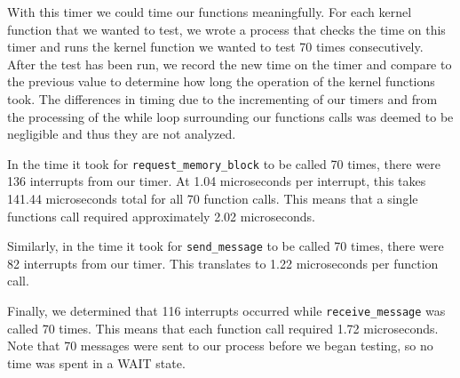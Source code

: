 \documentclass[12pt]{report}
\begin{document}
With this timer we could time our functions meaningfully.  For each kernel function that we wanted to test, we wrote a process that checks the time on this timer and runs the kernel function we wanted to test 70 times consecutively.  After the test has been run, we record the new time on the timer and compare to the previous value to determine how long the operation of the kernel functions took.  The differences in timing due to the incrementing of our timers and from the processing of the while loop surrounding our functions calls was deemed to be negligible and thus they are not analyzed.

In the time it took for \texttt{request_memory_block} to be called 70 times, there were 136 interrupts from our timer.  At 1.04 microseconds per interrupt, this takes 141.44 microseconds total for all 70 function calls.  This means that a single functions call required approximately 2.02 microseconds.

Similarly, in the time it took for \texttt{send_message} to be called 70 times, there were 82 interrupts from our timer.  This translates to 1.22 microseconds per function call.

Finally, we determined that 116 interrupts occurred while \texttt{receive_message} was called 70 times.  This means that each function call required 1.72 microseconds.  Note that 70 messages were sent to our process before we began testing, so no time was spent in a WAIT state.
\end{document}
